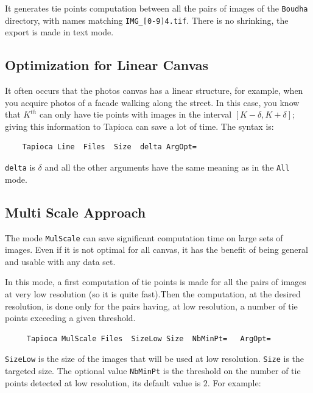 It generates tie points computation between all the pairs of images of the {\tt Boudha} directory,
with names matching {\tt IMG\_[0-9]{4}.tif}. There is no shrinking, the export is
made in text mode.


\subsection{Optimization for Linear Canvas}

It often occurs that the photos canvas  has a linear structure, for example, when you acquire
photos of a facade walking  along the street.   In this case, you
know that $K^{th}$  can only have tie points
with images in the interval $[K-\delta,K+\delta]$; giving this information
to Tapioca can save a lot of time. The syntax is:

{\scriptsize
\begin{verbatim}
    Tapioca Line  Files  Size  delta ArgOpt=
\end{verbatim}
}

{\tt delta} is $\delta$ and all the other arguments have the same meaning as in the
 {\tt All} mode.


\subsection{Multi Scale Approach}


The mode  {\tt MulScale} can save  significant computation time on large sets of images.
Even if it is not optimal for all canvas, it has the benefit of being general
and usable with any data set.

In this mode, a first computation of tie points is made for all the pairs
of images at very low resolution (so it is quite fast).Then the
computation, at the desired resolution, is done  only for the pairs
having, at low resolution, a number  of tie points exceeding a given
threshold.



{\scriptsize
\begin{verbatim}
     Tapioca MulScale Files  SizeLow Size  NbMinPt=   ArgOpt=
\end{verbatim}
}

{\tt SizeLow} is the size of the images that will be used at low resolution.
{\tt Size} is the targeted size.  The optional value {\tt NbMinPt}
is the threshold on the number of tie points detected at low resolution,
its default value is $2$. For example:

